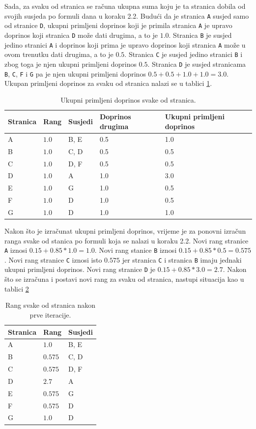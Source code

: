 \documentclass[times, utf8, zavrsni, numeric]{fer}
\begin{document}
Sada, za svaku od stranica se računa ukupna suma koju je ta stranica dobila od svojih susjeda po formuli dana u koraku 2.2.
Budući da je stranica \texttt{A} susjed samo od stranice \texttt{D}, ukupni primljeni doprinos koji je primila stranica \texttt{A} je upravo doprinos koji stranica \texttt{D} može dati drugima, a to je $1.0$. Stranica \texttt{B} je susjed jedino stranici \texttt{A} i doprinos koji prima je upravo doprinos koji stranica \texttt{A} može u ovom trenutku dati drugima, a to je $0.5$. Stranica \texttt{C} je susjed jedino stranici \texttt{B} i zbog toga je njen ukupni primljeni doprinos $0.5$. Stranica \texttt{D} je susjed stranicama \texttt{B}, \texttt{C}, \texttt{F} i \texttt{G} pa je njen ukupni primljeni doprinos $0.5 + 0.5 + 1.0 + 1.0 = 3.0$. Ukupan primljeni doprinos za svaku od stranica nalazi se u tablici \ref{tbl:pageRankKorak22ap1}.
\pagebreak
\begin{table}[htb]
\caption{Ukupni primljeni doprinos svake od stranica.}
\label{tbl:pageRankKorak22ap1}
\centering
\begin{tabular}{lllll} 
\hline
Stranica & Rang & Susjedi & Doprinos drugima & Ukupni primljeni doprinos\\
\hline
A & $1.0$ & B, E & 0.5 & 1.0\\
B & $1.0$ & C, D & 0.5 & 0.5\\
C & $1.0$ & D, F & 0.5 & 0.5\\
D & $1.0$ & A & 1.0 & 3.0\\
E & $1.0$ & G & 1.0 & 0.5\\
F & $1.0$ & D & 1.0 & 0.5\\
G & $1.0$ & D & 1.0 & 1.0\\
\hline
\end{tabular}
\end{table}

Nakon što je izračunat ukupni primljeni doprinos, vrijeme je za ponovni izračun ranga svake od stanica po formuli koja se nalazi u koraku 2.2. Novi rang stranice \texttt{A} iznosi $0.15 + 0.85 * 1.0 = 1.0$. Novi rang stanice \texttt{B} iznosi $0.15 + 0.85 * 0.5 = 0.575$. Novi rang stranice \texttt{C} iznosi isto $0.575$ jer stranica \texttt{C} i stranica \texttt{B} imaju jednaki ukupni primljeni doprinos. Novi rang stranice \texttt{D} je $0.15 + 0.85 * 3.0 = 2.7$. Nakon što se izračuna i postavi novi rang za svaku od stranica, nastupi situacija kao u tablici \ref{tbl:pageRankStanje1}

\begin{table}[htb]
\caption{Rang svake od stranica nakon prve iteracije.}
\label{tbl:pageRankStanje1}
\centering
\begin{tabular}{lll} 
\hline
Stranica & Rang & Susjedi \\
\hline
A & $1.0$ & B, E\\
B & $0.575$ & C, D\\
C & $0.575$ & D, F\\
D & $2.7$ & A\\
E & $0.575$ & G\\
F & $0.575$ & D\\
G & $1.0$ & D\\
\hline
\end{tabular}
\end{table}
\end{document}
